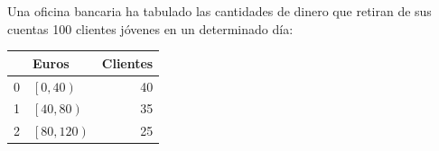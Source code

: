 \documentclass[addpoints,spanish, 12pt,a4paper]{exam}
\begin{document}
\begin{questions}



\question Una oficina bancaria ha tabulado las cantidades de dinero que retiran de sus cuentas 100 clientes jóvenes en
un determinado día:

\begin{tabular}{rlr}
\hline
    & Euros                  &   Clientes \\
\hline
  0 & $\left[0, 40\right)$   &         40 \\
  1 & $\left[40, 80\right)$  &         35 \\
  2 & $\left[80, 120\right)$ &         25 \\
\hline
\end{tabular}
\begin{parts}

\end{parts}
\end{questions}
\end{document}
